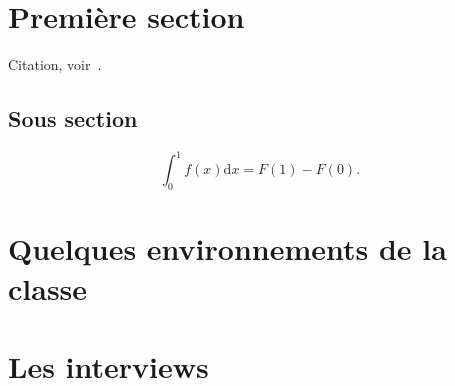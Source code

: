 \documentclass{matapli}
\begin{document}

\author[
affiliation = {CNRS, Laboratoire de l'université de France},
minibio = {Georges \bsc{Felepin} est Ingénieur de Recherche au CNRS. Sa discrétion n'a d'égal que l'ampleur de ses travaux.},
photo = portrait.png,
email = georges@felepin.fr,
webpage = www.felepin.fr/
]
{Felepin,Georges}

\author[
type=collectif,
]
{Centre National de la Recherche Scientifique}

\articletableofcontents


\section{Première section}

\lipsum[1-4]
Citation, voir~\cite{Knuth1984}.

\subsection{Sous section}
\lipsum[5]

\[\int_0^1 f(x)\mathrm{d}x=F(1)-F(0).\]

\section{Quelques environnements de la classe}

\lipsum[1]

\begin{bloc}
  \lipsum[10]
\end{bloc}

\begin{Important}
\lipsum[8]
\end{Important}

\section{Les interviews}

\end{document}
